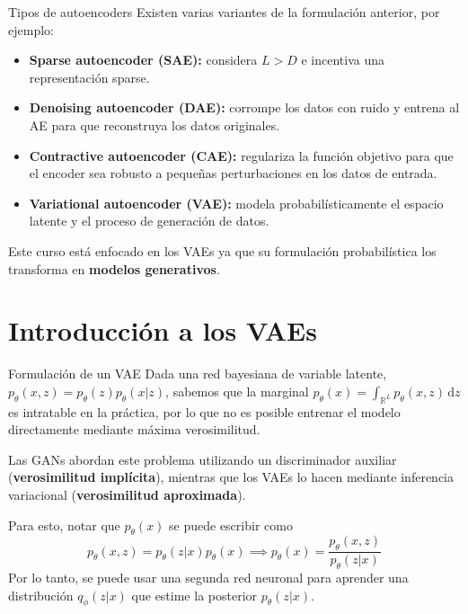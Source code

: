 \documentclass{beamer}
\newcommand{\R}{\mathbb{R}}
\begin{document}
\begin{frame}{Tipos de autoencoders}
    Existen varias variantes de la formulación anterior, por ejemplo:
    \vspace{-0.5cm}
    \begin{itemize}
        \item \textbf{Sparse autoencoder (SAE):} considera $L>D$ e incentiva una representación sparse.
        \item \textbf{Denoising autoencoder (DAE):} corrompe los datos con ruido y entrena al AE para que reconstruya los datos originales.
        \item \textbf{Contractive autoencoder (CAE):} regulariza la función objetivo para que el encoder sea robusto a pequeñas perturbaciones en los datos de entrada.
        \item \textbf{Variational autoencoder (VAE):} modela probabilísticamente el espacio latente y el proceso de generación de datos.
    \end{itemize}
    Este curso está enfocado en los VAEs ya que su formulación probabilística los transforma en \textbf{modelos generativos}.
\end{frame}

\section{Introducción a los VAEs}

\begin{frame}{Formulación de un VAE}
    Dada una red bayesiana de variable latente, $p_\theta(x,z)=p_\theta(z)p_\theta(x|z)$, sabemos que la marginal $p_\theta(x)=\int_{\R^L} p_\theta(x,z)\,\text{d}z$ es intratable en la práctica, por lo que no es posible entrenar el modelo directamente mediante máxima verosimilitud.

    Las GANs abordan este problema utilizando un discriminador auxiliar (\textbf{verosimilitud implícita}), mientras que los VAEs lo hacen mediante inferencia variacional (\textbf{verosimilitud aproximada}).

    Para esto, notar que $p_\theta(x)$ se puede escribir como
    \begin{equation*}
        p_\theta(x,z)=p_\theta(z|x)p_\theta(x)\implies p_\theta(x)=\frac{p_\theta(x,z)}{p_\theta(z|x)}
    \end{equation*}
    Por lo tanto, se puede usar una segunda red neuronal para aprender una distribución $q_\phi(z|x)$ que estime la posterior $p_\theta(z|x)$.
\end{frame}
\end{document}
